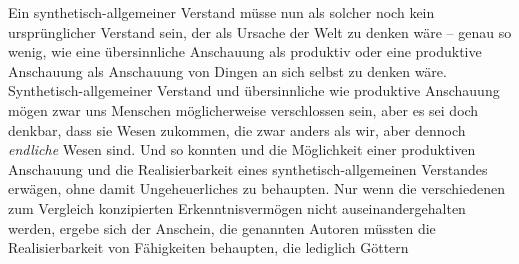 \label{Absatz:IntuitiverVerstandIntellektuelleAnschauungEndlicherWesen}
Ein synthetisch-allgemeiner Verstand müsse nun als solcher noch kein
ursprünglicher Verstand sein, der als Ursache der Welt zu denken wäre -- genau
so wenig, wie eine übersinnliche Anschauung als produktiv oder eine produktive
Anschauung als Anschauung von Dingen an sich selbst zu denken wäre.
Synthetisch-allgemeiner Verstand und übersinnliche wie produktive Anschauung
mögen zwar uns Menschen möglicherweise verschlossen sein, aber es sei doch denkbar, dass sie
Wesen zukommen, die zwar anders als wir, aber dennoch \emph{endliche} Wesen
sind. Und so konnten  und
 die Möglichkeit einer
produktiven Anschauung und  die
Realisierbarkeit eines synthetisch-allgemeinen Verstandes erwägen, ohne damit Ungeheuerliches zu
behaupten. Nur wenn die verschiedenen zum Vergleich konzipierten
Erkenntnisvermögen nicht auseinandergehalten werden,
ergebe sich der Anschein, die genannten Autoren müssten die Realisierbarkeit
von Fähigkeiten behaupten, die lediglich Göttern
